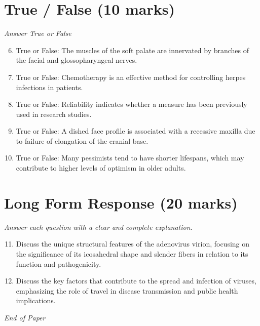 \documentclass[12pt]{article}
\begin{document}
\section*{True / False (10 marks)}
\textit{Answer True or False}
\begin{enumerate}[label=\arabic*.]
\setcounter{enumi}{5}
\item True or False: The muscles of the soft palate are innervated by branches of the facial and glossopharyngeal nerves.
\item True or False: Chemotherapy is an effective method for controlling herpes infections in patients.
\item True or False: Reliability indicates whether a measure has been previously used in research studies.
\item True or False: A dished face profile is associated with a recessive maxilla due to failure of elongation of the cranial base.
\item True or False: Many pessimists tend to have shorter lifespans, which may contribute to higher levels of optimism in older adults.
\end{enumerate}

\section*{Long Form Response (20 marks)}
\textit{Answer each question with a clear and complete explanation.}
\begin{enumerate}[label=\arabic*.]
\setcounter{enumi}{10}
\item Discuss the unique structural features of the adenovirus virion, focusing on the significance of its icosahedral shape and slender fibers in relation to its function and pathogenicity.
\item Discuss the key factors that contribute to the spread and infection of viruses, emphasizing the role of travel in disease transmission and public health implications.
\end{enumerate}

\vfill
\noindent\textit{End of Paper}
\end{document}
